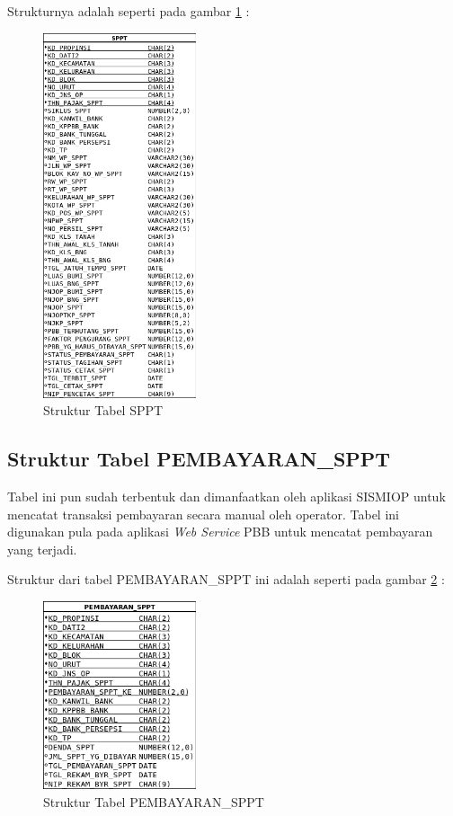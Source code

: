 \documentclass[pdftex,12pt, oneside]{article}
\begin{document}
Strukturnya adalah seperti pada gambar \ref{fig:tabel-sppt} :

\begin{figure}[H]
  \centering
  \includegraphics[width=0.4\textwidth]{./resources/01-struktur-tabel-sppt}
  \caption{Struktur Tabel SPPT}
  \label{fig:tabel-sppt}
\end{figure}

\subsection{Struktur Tabel PEMBAYARAN\_SPPT}

Tabel ini pun sudah terbentuk dan dimanfaatkan oleh aplikasi SISMIOP untuk mencatat transaksi pembayaran secara manual oleh operator. Tabel ini digunakan pula pada aplikasi \textit{Web Service} PBB untuk mencatat pembayaran yang terjadi.

Struktur dari tabel PEMBAYARAN\_SPPT ini adalah seperti pada gambar \ref{fig:tabel-pembayaran-sppt} :

\begin{figure}[H]
  \centering
  \includegraphics[width=0.4\textwidth]{./resources/02-struktur-tabel-pembayaran-sppt}
  \caption{Struktur Tabel PEMBAYARAN\_SPPT}
  \label{fig:tabel-pembayaran-sppt}
\end{figure}
\end{document}
